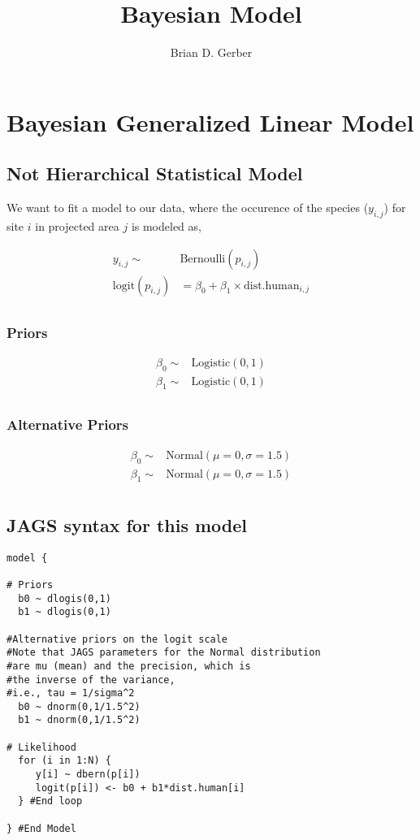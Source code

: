 \documentclass[12pt]{article}
\title{Bayesian  Model}
\author{Brian D. Gerber}
\begin{document}
\maketitle
\section{Bayesian Generalized Linear  Model}
\subsection{Not Hierarchical Statistical Model}

\Large

We want to fit a model to our data, where the occurence of the species ($y_{i,j}$) for site $i$ in projected area $j$ is modeled as,

\begin{align*}
y_{i,j}\sim& \text{Bernoulli}(p_{i,j})\\
\text{logit}(p_{i,j}) &= \beta_{0} + \beta_{1}\times \text{dist.human}_{i,j}\\
\end{align*}

\subsubsection{Priors}

\begin{align*}
\beta_{0} \sim& \text{Logistic}(0, 1)\\
\beta_{1} \sim& \text{Logistic}(0, 1)\\
\end{align*}


\subsubsection{Alternative Priors}


\begin{align*}
\beta_{0} \sim& \text{Normal}(\mu = 0, \sigma = 1.5)\\
\beta_{1} \sim& \text{Normal}(\mu= 0, \sigma = 1.5)\\
\end{align*}


\pagebreak

\subsection{JAGS syntax for this model}

\begin{verbatim}
model {

# Priors
  b0 ~ dlogis(0,1)
  b1 ~ dlogis(0,1)

#Alternative priors on the logit scale
#Note that JAGS parameters for the Normal distribution
#are mu (mean) and the precision, which is 
#the inverse of the variance,
#i.e., tau = 1/sigma^2
  b0 ~ dnorm(0,1/1.5^2)
  b1 ~ dnorm(0,1/1.5^2)

# Likelihood
  for (i in 1:N) {
     y[i] ~ dbern(p[i])
     logit(p[i]) <- b0 + b1*dist.human[i]
  } #End loop
  
} #End Model
\end{verbatim}
\end{document}

